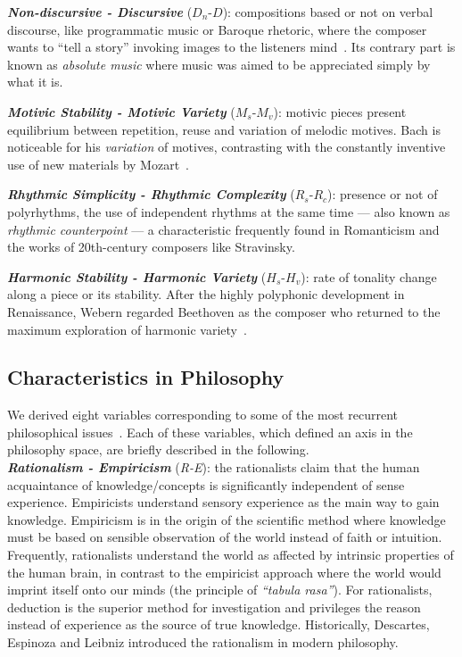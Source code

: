 \documentclass[
 aip,
 jmp,
 amsmath,amssymb,
 reprint,
]{revtex4-1}
\begin{document}
{\bf \em{ Non-discursive - Discursive}} ($D_n$-$D$): compositions
based or not on verbal discourse, like programmatic music or Baroque
rhetoric, where the composer wants to ``tell a story'' invoking images
to the listeners mind~\cite{BennettHistory}. Its contrary part is
known as \textit{absolute music} where music was aimed to be
appreciated simply by what it is.

{\bf \em{ Motivic Stability - Motivic Variety}} ($M_s$-$M_v$): motivic
pieces present equilibrium between repetition, reuse and variation of
melodic motives. Bach is noticeable for his \textit{variation} of
motives, contrasting with the constantly inventive use of new
materials by Mozart~\cite{Webern}.

{\bf \em{ Rhythmic Simplicity - Rhythmic Complexity}} ($R_s$-$R_c$):
presence or not of polyrhythms, the use of independent rhythms at the
same time --- also known as \textit{rhythmic
  counterpoint}\cite{BennettHistory} --- a characteristic frequently
found in Romanticism and the works of 20th-century composers like
Stravinsky.

{\bf \em{ Harmonic Stability - Harmonic Variety}} ($H_s$-$H_v$): rate
of tonality change along a piece or its stability. After the highly
polyphonic development in Renaissance, Webern regarded Beethoven as
the composer who returned to the maximum exploration of harmonic
variety~\cite{Webern}.

\subsection{Characteristics in Philosophy}

We derived eight variables corresponding to some of the most recurrent
philosophical issues~\cite{Russel,Papineau,Deleuze2}. Each of these
variables, which defined an axis in the philosophy space, are briefly
described in the following. \\

{\bf \em{ Rationalism - Empiricism}} (\emph{R-E}): the rationalists
claim that the human acquaintance of knowledge/concepts is
significantly independent of sense experience. Empiricists understand
sensory experience as the main way to gain knowledge. Empiricism is in
the origin of the scientific method where knowledge must be based on
sensible observation of the world instead of faith or
intuition. Frequently, rationalists understand the world as affected
by intrinsic properties of the human brain, in contrast to the
empiricist approach where the world would imprint itself onto our
minds (the principle of \emph{``tabula rasa''}). For rationalists,
deduction is the superior method for investigation and privileges the
reason instead of experience as the source of true
knowledge. Historically, Descartes, Espinoza and Leibniz introduced
the rationalism in modern philosophy.
\end{document}
